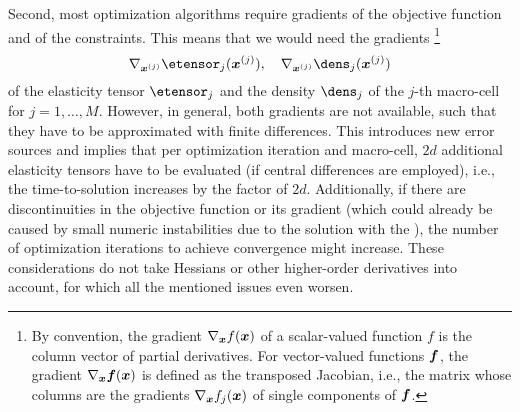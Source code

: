 Second, most optimization algorithms require gradients of the
objective function and of the constraints.
This means that we would need the gradients%
\footnote{%
  By convention, the gradient $\nabla_{{\boldsymbol{x}}} f({\boldsymbol{x}})$ of a
  scalar-valued function $f$ is the column vector of partial derivatives.
  For vector-valued functions ${\boldsymbol{f}}$, the gradient $\nabla_{{\boldsymbol{x}}} {\boldsymbol{f}}({\boldsymbol{x}})$
  is defined as the transposed Jacobian, i.e., the matrix whose columns
  are the gradients $\nabla_{{\boldsymbol{x}}} f_j({\boldsymbol{x}})$ of single components of
  ${\boldsymbol{f}}$.%
}
\begin{equation}
  \nabla_{\*x^{(j)}} \etensor_j(\*x^{(j)}),\quad
  \nabla_{\*x^{(j)}} \dens_j(\*x^{(j)})
\end{equation}
of the elasticity tensor $\etensor_j$ and
the density $\dens_j$ of the $j$-th macro-cell for $j = 1, \dotsc, M$.
However, in general, both gradients are not available,
such that they have to be approximated with finite differences.
This introduces new error sources and implies that
per optimization iteration and macro-cell,
$2d$ additional elasticity tensors have to be evaluated
(if central differences are employed), i.e.,
the time-to-solution increases by the factor of $2d$.
Additionally, if there are discontinuities in the objective function
or its gradient (which could already be caused by small numeric instabilities
due to the solution with the \fem),
the number of optimization iterations to achieve convergence might
increase.
These considerations do not take Hessians or other higher-order derivatives
into account, for which all the mentioned issues even worsen.
